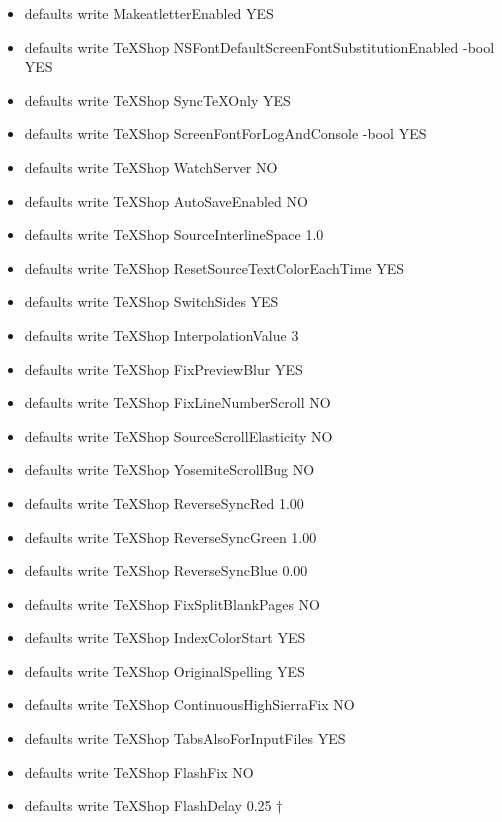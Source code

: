 \documentclass[11pt, oneside]{article}   	%
\begin{document}
\begin{itemize}
\item defaults write MakeatletterEnabled YES
\item defaults write TeXShop NSFontDefaultScreenFontSubstitutionEnabled -bool YES
\item defaults write TeXShop SyncTeXOnly YES
\item defaults write TeXShop ScreenFontForLogAndConsole -bool YES
\item defaults write TeXShop WatchServer NO
\item defaults write TeXShop AutoSaveEnabled NO
\item defaults write TeXShop SourceInterlineSpace 1.0
\item defaults write TeXShop ResetSourceTextColorEachTime YES
\item defaults write TeXShop SwitchSides YES
\item defaults write TeXShop InterpolationValue 3
\item defaults write TeXShop FixPreviewBlur YES
\item defaults write TeXShop FixLineNumberScroll NO
\item defaults write TeXShop SourceScrollElasticity NO
\item defaults write TeXShop YosemiteScrollBug NO
\item defaults write TeXShop ReverseSyncRed 1.00 
\item defaults write TeXShop ReverseSyncGreen 1.00 
\item defaults write TeXShop ReverseSyncBlue 0.00
\item defaults write TeXShop FixSplitBlankPages NO
\item defaults write TeXShop IndexColorStart YES
\item defaults write TeXShop OriginalSpelling YES
\item defaults write TeXShop ContinuousHighSierraFix NO
\item defaults write TeXShop TabsAlsoForInputFiles YES
\item defaults write TeXShop FlashFix NO
\item defaults write TeXShop FlashDelay 0.25
†\end{itemize}
\end{document}
